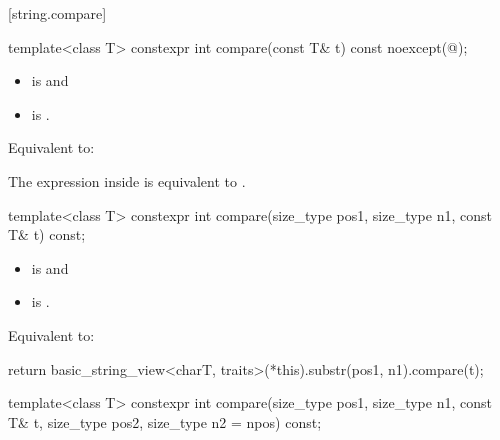 [string.compare]{}

%
\begin{itemdecl}
template<class T>
  constexpr int compare(const T& t) const noexcept(@\seebelow@);
\end{itemdecl}

\begin{itemdescr}
\pnum
\constraints
\begin{itemize}
\item
{} is
 and
\item
{} is
.
\end{itemize}

\pnum
\effects
Equivalent to: 

\pnum
\remarks
The expression inside  is equivalent to
.
\end{itemdescr}

%
\begin{itemdecl}
template<class T>
  constexpr int compare(size_type pos1, size_type n1, const T& t) const;
\end{itemdecl}

\begin{itemdescr}
\pnum
\constraints
\begin{itemize}
\item
{} is
 and
\item
{} is
.
\end{itemize}

\pnum
\effects
Equivalent to:
\begin{codeblock}
return basic_string_view<charT, traits>(*this).substr(pos1, n1).compare(t);
\end{codeblock}
\end{itemdescr}

%
\begin{itemdecl}
template<class T>
  constexpr int compare(size_type pos1, size_type n1, const T& t,
                        size_type pos2, size_type n2 = npos) const;
\end{itemdecl}

